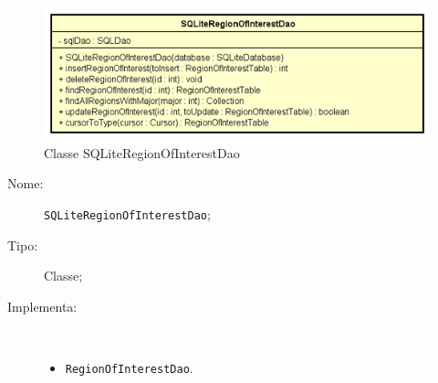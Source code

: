 \documentclass[../DefinizioneDiProdotto.tex]{subfiles}
\begin{document}
    \begin{figure}[H]
        \centering
        \includegraphics{img/SQLiteRegionOfInterestDao.png}
        \caption{Classe SQLiteRegionOfInterestDao}\label{fig:model::dataaccess::dao::SQLiteRegionOfInterestDao} 
    \end{figure}
    \begin{description}
\item[Nome:] \texttt{SQLiteRegionOfInterestDao};
\item[Tipo:] Classe;
\item[Implementa:] \
\begin{itemize}
\item \texttt{RegionOfInterestDao}.


\end{itemize}
\end{description}
\end{document}
